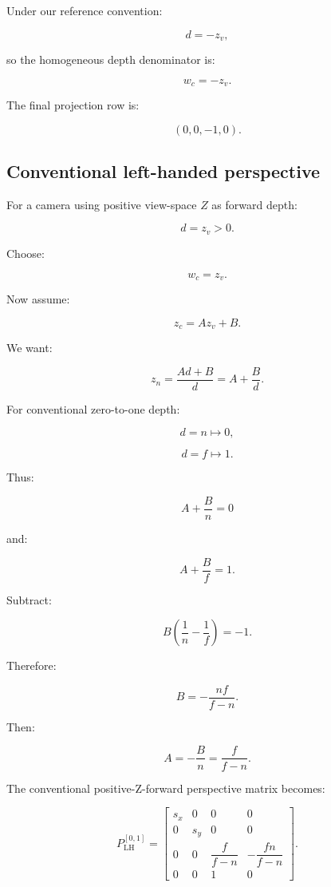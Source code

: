 \hypertarget{02-foundations-ii-ch033-right-handed-projection}{}

Under our reference convention:

\[
 d=-z_v,
\]

so the homogeneous depth denominator is:

\[
 \boxed{w_c=-z_v}.
\]

The final projection row is:

\[
 \boxed{ (0,0,-1,0) }.
\]

\subsection{Conventional left-handed perspective}\label{02-foundations-ii-ch033-conventional-left-handed-perspective}

\hypertarget{02-foundations-ii-ch033-conventional-left-handed-perspective}{}

For a camera using positive view-space \(Z\) as forward depth:

\[
 d=z_v>0.
\]

Choose:

\[
 \boxed{w_c=z_v}.
\]

Now assume:

\[
 z_c=Az_v+B.
\]

We want:

\[
 z_n=\frac{Ad+B}{d} =A+\frac Bd.
\]

For conventional zero-to-one depth:

\[
 d=n\mapsto0,
\]

\[
 d=f\mapsto1.
\]

Thus:

\[
 A+\frac Bn=0
\]

and:

\[
 A+\frac Bf=1.
\]

Subtract:

\[
 B\left(\frac1n-\frac1f\right)=-1.
\]

Therefore:

\[
 \boxed{ B=-\frac{nf}{f-n} }.
\]

Then:

\[
 A=-\frac Bn=\frac f{f-n}.
\]

The conventional positive-Z-forward perspective matrix becomes:

\[
 \boxed{ P_{\mathrm{LH}}^{[0,1]}= \begin{bmatrix} s_x&0&0&0\\ 0&s_y&0&0\\ 0&0&\dfrac f{f-n}&-\dfrac{fn}{f-n}\\ 0&0&1&0 \end{bmatrix} }.
\]

